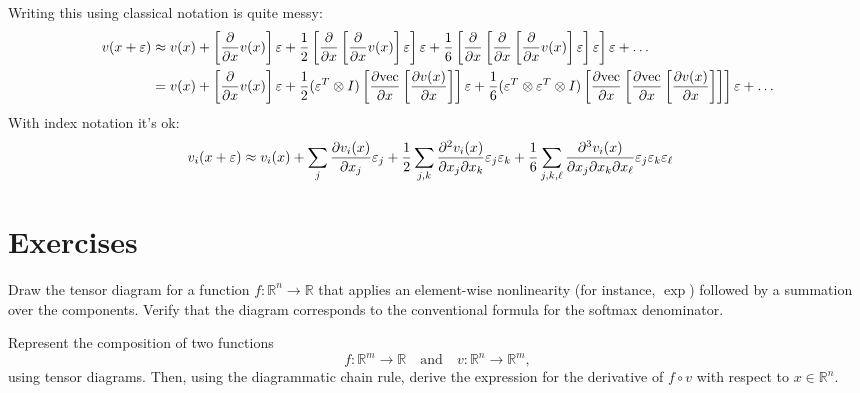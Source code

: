 Writing this using classical notation is quite messy:
\begin{align*}
    v(x + \varepsilon)
    &\approx
    v(x)
    + \left[\frac{\partial}{\partial x} v(x)\right]\varepsilon
    + \frac{1}{2}\left[\frac{\partial}{\partial x}\left[\frac{\partial}{\partial x} v(x)\right]\varepsilon\right]\varepsilon
    + \frac{1}{6}\left[\frac{\partial}{\partial x}\left[\frac{\partial}{\partial x} \left[\frac{\partial}{\partial x} v(x)\right]\varepsilon\right]\varepsilon\right]\varepsilon
    + \dots
    \\
    &=
    v(x)
    + \left[\frac{\partial}{\partial x} v(x)\right]\varepsilon
    +
    \frac{1}{2}
    (\varepsilon^T \otimes I)
    \left[\frac{\partial\mathrm{vec}}{\partial x}\left[\frac{\partial v(x)}{\partial x} \right]\right]\varepsilon
    + \frac{1}{6}
    (\varepsilon^T \otimes \varepsilon^T \otimes I)
    \left[\frac{\partial\mathrm{vec}}{\partial x}\left[\frac{\partial\mathrm{vec}}{\partial x} \left[\frac{\partial v(x)}{\partial x} \right]\right]\right]\varepsilon
    + \dots
\end{align*}
With index notation it's ok:
\begin{align*}
    v_i(x + \varepsilon)
    &\approx
    v_i(x)
    + \sum_j \frac{\partial v_i(x)}{\partial x_j} \varepsilon_j
    + \frac12 \sum_{j,k} \frac{\partial^2 v_i(x)}{\partial x_j\partial x_k} \varepsilon_j \varepsilon_k
   + \frac16 \sum_{j,k,\ell} \frac{\partial^3 v_i(x)}{\partial x_j\partial x_k\partial x_\ell} \varepsilon_j \varepsilon_k \varepsilon_\ell
\end{align*}



\section{Exercises}
\begin{exercise}
   Draw the tensor diagram for a function $f:\mathbb{R}^n\to\mathbb{R}$ that applies an element-wise nonlinearity (for instance, $\exp$) followed by a summation over the components. Verify that the diagram corresponds to the conventional formula for the softmax denominator.
\end{exercise}

\begin{exercise}
   Represent the composition of two functions 
   \[
      f:\mathbb{R}^m\to\mathbb{R} \quad \text{and} \quad v:\mathbb{R}^n\to\mathbb{R}^m,
   \]
   using tensor diagrams. Then, using the diagrammatic chain rule, derive the expression for the derivative of $f\circ v$ with respect to $x\in\mathbb{R}^n$.
\end{exercise}

